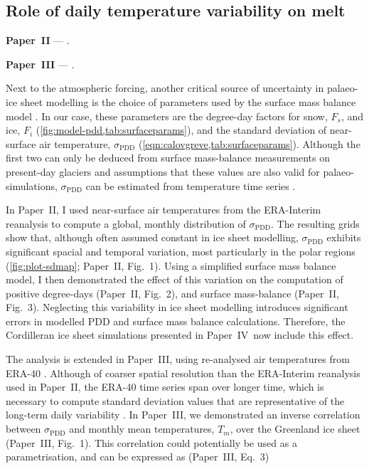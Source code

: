 \documentclass{article}
\newcommand{\sPDD}[0]{\sigma_{\mathrm{PDD}}}
\newcommand{\PSDV}[0]{Paper~II}     %
\newcommand{\PSDP}[0]{Paper~III}    %
\newcommand{\CCYC}[0]{Paper~IV}     %
\begin{document}
\subsection{Role of daily temperature variability on melt}

\noindent\textbf{\PSDV} --- .
\bigskip

\noindent\textbf{\PSDP} --- .
\bigskip

Next to the atmospheric forcing, another critical source of uncertainty in
palaeo-ice sheet modelling is the choice of parameters used by the surface mass
balance model \citep[e.g.,][]{Hebeler.etal.2008}. In our case, these parameters
are the degree-day factors for snow, $F_s$, and ice, $F_i$
(\cref{fig:model-pdd,tab:surfaceparams}), and the standard deviation of
near-surface air temperature, $\sPDD$
(\cref{eqn:calovgreve,tab:surfaceparams}). Although the first two can only be
deduced from surface mass-balance measurements on present-day glaciers
\citep[e.g.,][]{Shea.etal.2009} and assumptions that these values are also
valid for palaeo-simulations, $\sPDD$ can be estimated from temperature time
series \citep[e.g.,][]{Fausto.etal.2011}.

In \PSDV, I used near-surface air temperatures from the ERA-Interim reanalysis
\citep{Dee.etal.2011} to compute a global, monthly distribution of $\sPDD$. The
resulting grids show that, although often assumed constant in ice sheet
modelling, $\sPDD$ exhibits significant spacial and temporal variation, most
particularly in the polar regions (\cref{fig:plot-sdmap}; \PSDV, Fig.~1). Using
a simplified surface mass balance model, I then demonstrated the effect of this
variation on the computation of positive degree-days (\PSDV, Fig.~2), and
surface mass-balance (\PSDV, Fig.~3). Neglecting this variability in ice sheet
modelling introduces significant errors in modelled PDD and surface mass
balance calculations. Therefore, the Cordilleran ice sheet simulations
presented in \CCYC\ now include this effect.

The analysis is extended in \PSDP, using re-analysed air
temperatures from ERA-40 \citep{Uppala.etal.2005}. Although of coarser spatial
resolution than the ERA-Interim reanalysis used in \PSDV, the ERA-40 time
series span over longer time, which is necessary to compute standard deviation
values that are representative of the long-term daily variability
\citep{Rogozhina.Rau.2014}. In \PSDP, we demonstrated an inverse correlation
between $\sPDD$ and monthly mean temperatures, $T_m$, over the Greenland ice
sheet (\PSDP, Fig.~1). This correlation could potentially be used as a
parametrisation, and can be expressed as (\PSDP, Eq.~3)
\end{document}
